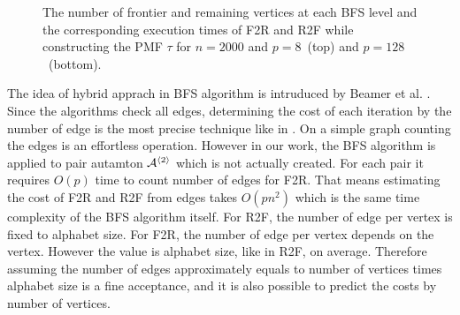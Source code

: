 \documentclass[12pt]{article}
\newcommand{\comment}[2]{{\color{red}{\bf (#1: #2)}}}
\begin{document}
\begin{figure}[ht]
{	}
	\caption{The number of frontier and remaining vertices at each BFS level and the corresponding execution times of F2R and R2F while constructing the PMF $\tau$ for $n = 2000$ and $p = 8$~(top) and $p=128$~(bottom). 
\comment{sertac}{sayilardaki virguller nokta olmali.}}%
	
	\label{fig:BFS-vtcomparison}
\end{figure}

The idea of hybrid apprach in BFS algorithm is intruduced by Beamer et al. \cite{Beamer}. Since the algorithms check all edges, determining the cost of each iteration by the number of edge is the most precise technique like in \cite{Beamer}. On a simple graph counting the edges is an effortless operation. However in our work, the BFS algorithm is applied to pair autamton ${\cal A}^{\langle 2 \rangle}$ which is not actually created. For each pair it requires $O(p)$ time to count number of edges for F2R. That means estimating the cost of F2R and R2F from edges takes $O(pn^2)$ which is the same time complexity of the BFS algorithm itself. For R2F, the number of edge per vertex is fixed to alphabet size. For F2R, the number of edge per vertex depends on the vertex. However the value is alphabet size, like in R2F, on average. Therefore assuming the number of edges approximately equals to number of vertices times alphabet size is a fine acceptance, and it is also possible to predict the costs by number of vertices.
\end{document}
